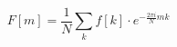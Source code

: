 \begin{equation}
  F[m] = \frac{1}{N}\sum_k f[k] \cdot e^{-\frac{2 \pi i}{N} m k}
\end{equation}

\gdlusesopenmp
{}
